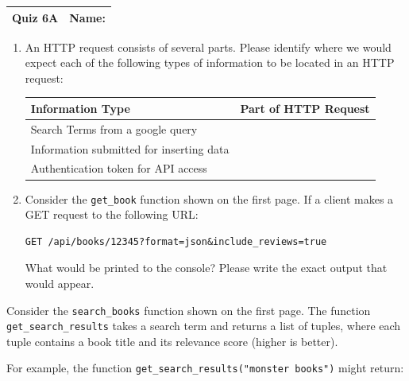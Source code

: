 \documentclass[11pt]{article}
\begin{document}
\clearpage

\begin{tabularx}{\textwidth}{l|X}
\textbf{Quiz 6A} &   \textbf{Name: } \\
\hline
\end{tabularx}


\begin{enumerate}

\item An HTTP request consists of several parts. Please identify where we would expect each of the following types of information to be located in an HTTP request:

\begin{table}[h]
\centering
\renewcommand{\arraystretch}{1.5}
\begin{tabular}{|p{7.5cm}|p{7.5cm}|}
\hline
\textbf{Information Type} & \textbf{Part of HTTP Request} \\
\hline
Search Terms from a google query & \\
\hline
Information submitted for inserting data & \\
\hline
Authentication token for API access & \\
\end{tabular}
\end{table}

\vspace{1cm}

\item Consider the \texttt{get\_book} function shown on the first page. If a client makes a GET request to the following URL:

\begin{verbatim}
GET /api/books/12345?format=json&include_reviews=true
\end{verbatim}

What would be printed to the console? Please write the exact output that would appear.

\vspace{6cm}
\end{enumerate}
\clearpage


\noindent Consider the \texttt{search\_books} function shown on the first page. The function \texttt{get\_search\_results} takes a search term and returns a list of tuples, where each tuple contains a book title and its relevance score (higher is better). 

\noindent For example, the function \texttt{get\_search\_results("monster books")} might return:
\end{document}
